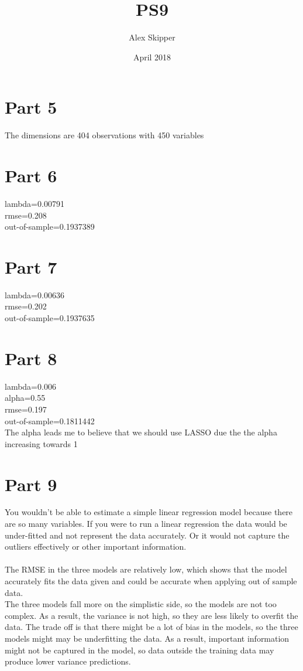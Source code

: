 \documentclass{article}
\title{PS9}
\author{Alex Skipper }
\date{April 2018}
\begin{document}
\maketitle

\section{Part 5}
The dimensions are 404 observations with 450 variables

\section{Part 6}
lambda=0.00791\\
rmse=0.208\\
out-of-sample=0.1937389
\section{Part 7}
lambda=0.00636\\
rmse=0.202\\
out-of-sample=0.1937635
\section{Part 8}
lambda=0.006\\
alpha=0.55 \\
rmse=0.197\\
out-of-sample=0.1811442\\
The alpha leads me to believe that we should use LASSO due the the alpha increasing towards 1 

\section{Part 9}
You wouldn't be able to estimate a simple linear regression model because there are so many variables. If you were to run a linear regression the data would be under-fitted and not represent the data accurately. Or it would not capture the outliers effectively or other important information.\\
\\
The RMSE in the three models are relatively low, which shows that the model accurately fits the data given and could be accurate when applying out of sample data. \\
The three models fall more on the simplistic side, so the models are not too complex. As a result, the variance is not high, so they are less likely to overfit the data. The trade off is that there might be a lot of bias in the models, so the three models might may be underfitting the data. As a result, important information might not be captured in the model, so data outside the training data may produce lower variance predictions. 
\end{document}
